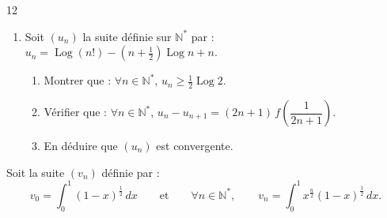 \documentclass{axiobac}
\begin{document}
\begin{probleme}{12}
\begin{enumerate}
    \item Soit $(u_n)$ la suite définie sur $\mathbb{N}^*$ par : $u_n = \operatorname{Log}(n!) - \left(n + \frac12\right) \operatorname{Log} n + n$.
    \begin{enumerate}
        \item Montrer que : $\forall n \in \mathbb{N}^*$, $u_n \geqslant \frac12 \operatorname{Log} 2$.
        \item Vérifier que : $\forall n \in \mathbb{N}^*$, $u_n - u_{n+1} = (2n + 1)\, f\!\left(\dfrac{1}{2n + 1}\right)$.
        \item En déduire que $(u_n)$ est convergente.
    \end{enumerate}
\end{enumerate}


Soit la suite $(v_n)$ définie par :
\[
v_0 = \int_0^1 (1 - x)^{\frac12}\,dx \qquad \text{et} \qquad \forall n \in \mathbb{N}^*, \qquad v_n = \int_0^1 x^{\frac{n}{2}} (1 - x)^{\frac12}\,dx .
\]


\end{probleme}
\end{document}
